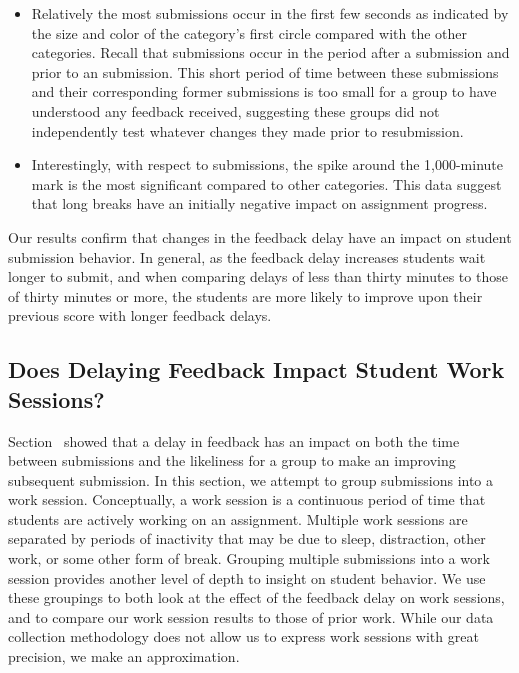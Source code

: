 \begin{itemize}
\item Relatively the most \noii{} submissions occur in the first few seconds as
  indicated by the size and color of the \noii{} category's first circle
  compared with the other categories. Recall that \noii{} submissions occur in
  the period after a \worse{} submission and prior to an \imp{}
  submission. This short period of time between these submissions and their
  corresponding former submissions is too small for a group to have understood
  any feedback received, suggesting these groups did not independently test
  whatever changes they made prior to resubmission.
\item Interestingly, with respect to \worse{} submissions, the spike around the
  1,000-minute mark is the most significant compared to other categories. This
  data suggest that long breaks have an initially negative impact on assignment
  progress.
\end{itemize}

Our results confirm that changes in the feedback delay have an impact on
student submission behavior. In general, as the feedback delay increases
students wait longer to submit, and when comparing delays of less than thirty
minutes to those of thirty minutes or more, the students are more likely to
improve upon their previous score with longer feedback delays.

\subsection{Does Delaying Feedback Impact Student Work Sessions?}

Section~ showed that a delay in feedback has an impact
on both the time between submissions and the likeliness for a group to make an
improving subsequent submission. In this section, we attempt to group
submissions into a work session. Conceptually, a work session is a continuous
period of time that students are actively working on an assignment. Multiple
work sessions are separated by periods of inactivity that may be due to sleep,
distraction, other work, or some other form of break. Grouping multiple
submissions into a work session provides another level of depth to insight on
student behavior. We use these groupings to both look at the effect of the
feedback delay on work sessions, and to compare our work session results to
those of prior work. While our data collection methodology does not allow us to
express work sessions with great precision, we make an approximation.


